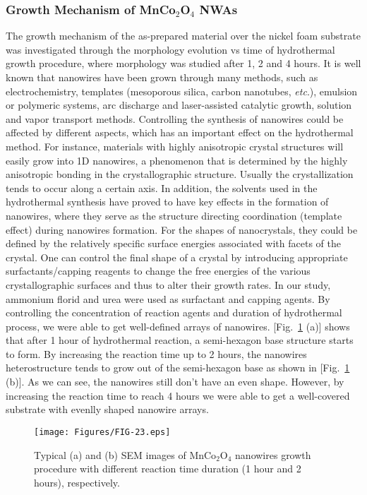 \documentclass[reprint,amsmath,amssymb,aps,floatfix,
]{revtex4-2}
\begin{document}
\subsubsection{Growth Mechanism of MnCo$_2$O$_4$ NWAs}
The growth mechanism of the as-prepared material over the nickel foam substrate was investigated through the morphology evolution vs time of hydrothermal growth procedure, where morphology was studied after 1, 2 and 4 hours. It is well known that nanowires have been grown through many methods, such as electrochemistry, templates (mesoporous silica, carbon nanotubes, {\it etc}.), emulsion or polymeric systems, arc discharge and laser-assisted catalytic growth, solution and vapor transport methods.\cite{Guifu2006} Controlling the synthesis of nanowires could be affected by different aspects, which has an important effect on the hydrothermal method. For instance, materials with highly anisotropic crystal structures will easily grow into 1D nanowires, a phenomenon that is determined by the highly anisotropic bonding in the crystallographic structure. Usually the crystallization tends to occur along a certain axis. In addition, the solvents used in the hydrothermal synthesis have proved to have key effects in the formation of nanowires, where they serve as the structure directing coordination (template effect) during nanowires formation. For the shapes of nanocrystals, they could be defined by the relatively specific surface energies associated with facets of the crystal. One can control the final shape of a crystal by introducing appropriate surfactants/capping reagents to change the free energies of the various crystallographic surfaces and thus to alter their growth rates. In our study, ammonium florid and urea were used as surfactant and capping agents. By controlling the concentration of reaction agents and duration of hydrothermal process, we were able to get well-defined arrays of nanowires. [Fig.~\ref{fig:fig23} (a)] shows that after 1 hour of hydrothermal reaction, a semi-hexagon base structure starts to form. By increasing the reaction time up to 2 hours, the nanowires heterostructure tends to grow out of the semi-hexagon base as shown in [Fig.~\ref{fig:fig23} (b)]. As we can see, the nanowires still don't have an even shape. However, by increasing the reaction time to reach 4 hours we were able to get a well-covered substrate with evenlly shaped nanowire arrays.
\begin{figure}[t]
    \centering
    \texttt{[image: Figures/FIG-23.eps]}
    \caption{\label{fig:fig23}Typical (a) and (b) SEM images of MnCo$_2$O$_4$ nanowires growth procedure with different reaction time duration (1 hour and 2 hours), respectively.}
    \end{figure}
\end{document}
